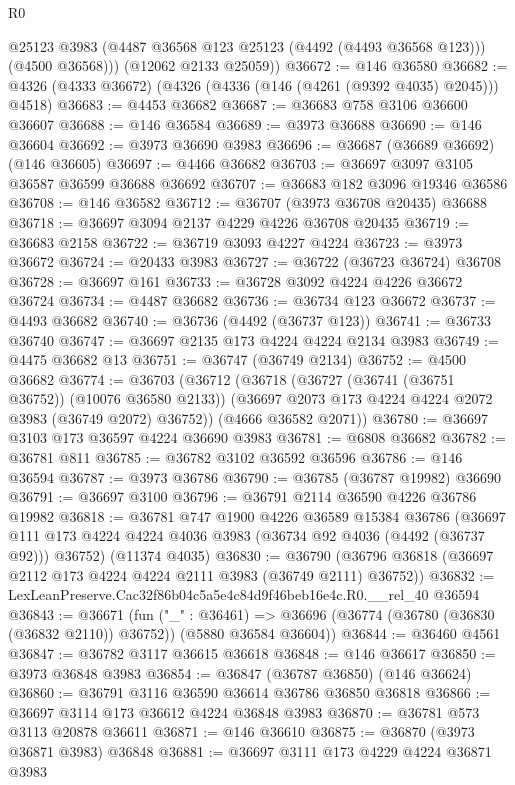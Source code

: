 \begin{lexlean}{R0}
\begin{coremodule}
          @25123
          @3983
          (@4487 @36568 @123 @25123 (@4492 (@4493 @36568 @123)))
          (@4500 @36568)))
      (@12062 @2133 @25059))
@36672 := @146 @36580
@36682 := @4326 (@4333 @36672) (@4326 (@4336 (@146 (@4261 (@9392 @4035) @2045))) @4518)
@36683 := @4453 @36682
@36687 := @36683 @758 @3106 @36600 @36607
@36688 := @146 @36584
@36689 := @3973 @36688
@36690 := @146 @36604
@36692 := @3973 @36690 @3983
@36696 := @36687 (@36689 @36692) (@146 @36605)
@36697 := @4466 @36682
@36703 := @36697 @3097 @3105 @36587 @36599 @36688 @36692
@36707 := @36683 @182 @3096 @19346 @36586
@36708 := @146 @36582
@36712 := @36707 (@3973 @36708 @20435) @36688
@36718 := @36697 @3094 @2137 @4229 @4226 @36708 @20435
@36719 := @36683 @2158
@36722 := @36719 @3093 @4227 @4224
@36723 := @3973 @36672
@36724 := @20433 @3983
@36727 := @36722 (@36723 @36724) @36708
@36728 := @36697 @161
@36733 := @36728 @3092 @4224 @4226 @36672 @36724
@36734 := @4487 @36682
@36736 := @36734 @123 @36672
@36737 := @4493 @36682
@36740 := @36736 (@4492 (@36737 @123))
@36741 := @36733 @36740
@36747 := @36697 @2135 @173 @4224 @4224 @2134 @3983
@36749 := @4475 @36682 @13
@36751 := @36747 (@36749 @2134)
@36752 := @4500 @36682
@36774 := @36703
    (@36712
      (@36718
        (@36727 (@36741 (@36751 @36752)) (@10076 @36580 @2133))
        (@36697 @2073 @173 @4224 @4224 @2072 @3983 (@36749 @2072) @36752))
      (@4666 @36582 @2071))
@36780 := @36697 @3103 @173 @36597 @4224 @36690 @3983
@36781 := @6808 @36682
@36782 := @36781 @811
@36785 := @36782 @3102 @36592 @36596
@36786 := @146 @36594
@36787 := @3973 @36786
@36790 := @36785 (@36787 @19982) @36690
@36791 := @36697 @3100
@36796 := @36791 @2114 @36590 @4226 @36786 @19982
@36818 := @36781
    @747
    @1900
    @4226
    @36589
    @15384
    @36786
    (@36697 @111 @173 @4224 @4224 @4036 @3983 (@36734 @92 @4036 (@4492 (@36737 @92))) @36752)
    (@11374 @4035)
@36830 := @36790 (@36796 @36818 (@36697 @2112 @173 @4224 @4224 @2111 @3983 (@36749 @2111) @36752))
@36832 := LexLeanPreserve.Cac32f86b04c5a5e4c84d9f46beb16e4c.R0.__rel_40 @36594
@36843 := @36671
    (fun ("_" : @36461) =>
    @36696 (@36774 (@36780 (@36830 (@36832 @2110)) @36752)) (@5880 @36584 @36604))
@36844 := @36460 @4561
@36847 := @36782 @3117 @36615 @36618
@36848 := @146 @36617
@36850 := @3973 @36848 @3983
@36854 := @36847 (@36787 @36850) (@146 @36624)
@36860 := @36791 @3116 @36590 @36614 @36786 @36850 @36818
@36866 := @36697 @3114 @173 @36612 @4224 @36848 @3983
@36870 := @36781 @573 @3113 @20878 @36611
@36871 := @146 @36610
@36875 := @36870 (@3973 @36871 @3983) @36848
@36881 := @36697 @3111 @173 @4229 @4224 @36871 @3983

\end{coremodule}
\end{lexlean}
